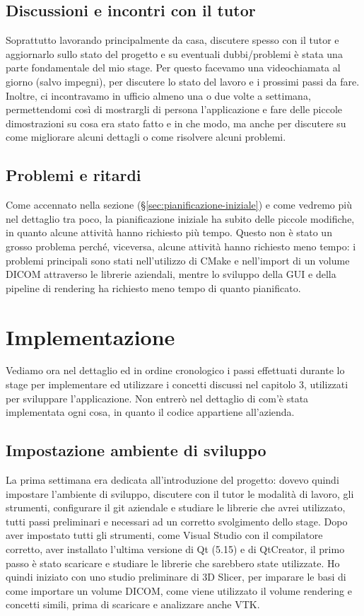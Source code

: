 \subsection{Discussioni e incontri con il tutor}
Soprattutto lavorando principalmente da casa, discutere spesso con il tutor e aggiornarlo sullo stato del progetto e su eventuali dubbi/problemi è stata una parte fondamentale del mio stage. Per questo facevamo una videochiamata al giorno (salvo impegni), per discutere lo stato del lavoro e i prossimi passi da fare. Inoltre, ci incontravamo in ufficio almeno una o due volte a settimana, permettendomi così di mostrargli di persona l'applicazione e fare delle piccole dimostrazioni su cosa era stato fatto e in che modo, ma anche per discutere su come migliorare alcuni dettagli o come risolvere alcuni problemi.

\subsection{Problemi e ritardi}\label{sec:problemi-ritardi}
Come accennato nella sezione  (§\ref{sec:pianificazione-iniziale}) e come vedremo più nel dettaglio tra poco, la pianificazione iniziale ha subito delle piccole modifiche, in quanto alcune attività hanno richiesto più tempo. Questo non è stato un grosso problema perché, viceversa, alcune attività hanno richiesto meno tempo: i problemi principali sono stati nell'utilizzo di CMake e nell'import di un volume DICOM attraverso le librerie aziendali, mentre lo sviluppo della GUI e della pipeline di rendering ha richiesto meno tempo di quanto pianificato.

\section{Implementazione}
Vediamo ora nel dettaglio ed in ordine cronologico i passi effettuati durante lo stage per implementare ed utilizzare i concetti discussi nel capitolo 3, utilizzati per sviluppare l'applicazione. Non entrerò nel dettaglio di com'è stata implementata ogni cosa, in quanto il codice appartiene all'azienda.

\subsection{Impostazione ambiente di sviluppo}
La prima settimana era dedicata all'introduzione del progetto: dovevo quindi impostare l'ambiente di sviluppo, discutere con il tutor le modalità di lavoro, gli strumenti, configurare il git aziendale e studiare le librerie che avrei utilizzato, tutti passi preliminari e necessari ad un corretto svolgimento dello stage.
Dopo aver impostato tutti gli strumenti, come Visual Studio con il compilatore corretto, aver installato l'ultima versione di Qt (5.15) e di QtCreator, il primo passo è stato scaricare e studiare le librerie che sarebbero state utilizzate. Ho quindi iniziato con uno studio preliminare di 3D Slicer, per imparare le basi di come importare un volume DICOM, come viene utilizzato il volume rendering e concetti simili, prima di scaricare e analizzare anche VTK. 

